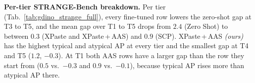 \noindent\textbf{Per-tier STRANGE-Bench breakdown.}
\label{app:gdino_strange_full}
Per tier (Tab.~\ref{tab:gdino_strange_full}), every fine-tuned row lowers the zero-shot gap at T3 to T5, and the mean gap over T1 to T5 drops from $2.4$ (Zero Shot) to between $0.3$ (XPaste and XPaste\,+\,AAS) and $0.9$ (SCP). XPaste\,+\,AAS \emph{(ours)} has the highest typical and atypical AP at every tier and the smallest gap at T4 and T5 ($1.2$, $-0.3$). At T1 both AAS rows have a larger gap than the row they start from ($0.5$ vs.\ $-0.3$ and $0.9$ vs.\ $-0.1$), because typical AP rises more than atypical AP there.

\begin{table}[!htp]%
\centering
\scriptsize
\setlength{\tabcolsep}{1.8pt}%
\caption{\textbf{Grounding DINO Swin-B: STRANGE-Bench per-tier breakdown.} The zero-shot gap appears once a scene holds two partners ($3.6$ to $4.2$~p.p.\@ at T3 to T5, against $-0.1$ and $0.6$ at T1 and T2); after paste fine-tuning it stays below $3$~p.p.\@ at every tier, and XPaste\,+\,AAS \emph{(ours)} has the highest typical and atypical AP at every tier and the highest $T_{\text{never}}$. Full-annotation bbox mAP (\%) of the typical (T) and atypical (A) arm of each tier and their gap $\Delta$; $T_{1\text{-}5}$ is the mean over T1 to T5, rows as in Tab.~\ref{tab:grounding_dino_main}. Best per column in \textbf{bold}, second-best~\underline{underlined}.}
\label{tab:gdino_strange_full}
\resizebox{\linewidth}{!}{%

}
\end{table}
